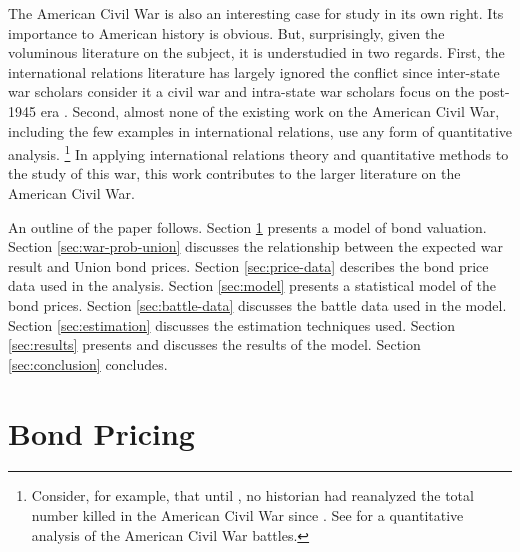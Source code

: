 \documentclass[11pt, oneside, article]{memoir}
\begin{document}
The American Civil War is also an interesting case for study in its own right. 
Its importance to American history is obvious.
But, surprisingly, given the voluminous literature on the subject, it is understudied in two regards. %
First, the international relations literature has largely ignored the conflict since inter-state war scholars consider it a civil war and intra-state war scholars focus on the post-1945 era \parencites[140-141]{Reiter2009}[2]{Poast2012}. %
Second, almost none of the existing work on the American Civil War, including the few examples in international relations, use any form of quantitative analysis.%
\footnote{
  Consider, for example, that until \textcite{hacker2011census}, no historian had reanalyzed the total  number killed in the American Civil War since  \textcite{Livermore1900}. 
  See \textcite{Weiss1966} for a quantitative analysis of the American Civil War battles.
} %
In applying international relations theory and quantitative methods to the study of this war, this work contributes to the larger literature on the American Civil War.

An outline of the paper follows.
Section \ref{sec:risky-bond-pricing} presents a model of bond valuation.
Section \ref{sec:war-prob-union} discusses the relationship between the expected war result and Union bond prices.
Section \ref{sec:price-data} describes the bond price data used in the analysis.
Section \ref{sec:model} presents a statistical model of the bond prices.
Section \ref{sec:battle-data} discusses the battle data used in the model.
Section \ref{sec:estimation} discusses the estimation techniques used.
Section \ref{sec:results} presents and discusses the results of the model.
Section \ref{sec:conclusion} concludes.


\section{Bond Pricing}
\label{sec:risky-bond-pricing}
\end{document}
